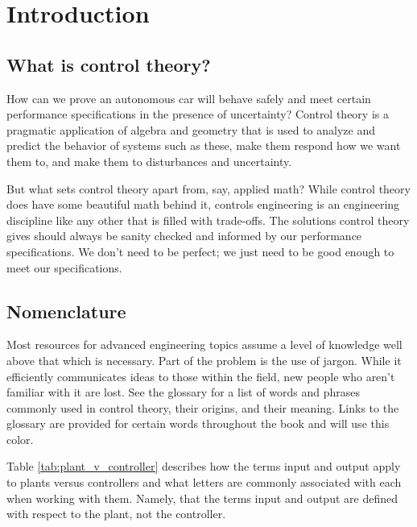 
\chapter{Introduction}

\section{What is control theory?}

How can we prove an autonomous car will behave safely and meet certain
performance specifications in the presence of uncertainty? Control theory is a
pragmatic application of algebra and geometry that is used to analyze and
predict the behavior of \glspl{system} such as these, make them respond how we
want them to, and make them  to \glspl{disturbance}
and uncertainty.

But what sets control theory apart from, say, applied math? While control theory
does have some beautiful math behind it, controls engineering is an engineering
discipline like any other that is filled with trade-offs. The solutions control
theory gives should always be sanity checked and informed by our performance
specifications. We don't need to be perfect; we just need to be good enough to
meet our specifications.

\section{Nomenclature}

Most resources for advanced engineering topics assume a level of knowledge well
above that which is necessary. Part of the problem is the use of jargon. While
it efficiently communicates ideas to those within the field, new people who
aren't familiar with it are lost. See the glossary for a list of words and
phrases commonly used in control theory, their origins, and their meaning. Links
to the glossary are provided for certain words throughout the book and will use
\textcolor{glscolor}{this color}.

Table \ref{tab:plant_v_controller} describes how the terms \gls{input} and
\gls{output} apply to \glspl{plant} versus \glspl{controller} and what letters
are commonly associated with each when working with them. Namely, that the terms
\gls{input} and \gls{output} are defined with respect to the \gls{plant}, not
the \gls{controller}.

